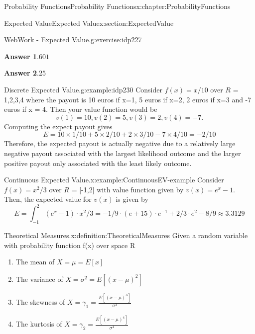 \documentclass[oneside,10pt,]{book}
\newcommand{\blocktitlefont}{\relax}
\numberwithin{equation}{section}
\begin{document}
\begin{chapterptx}{Probability Functions}{}{Probability Functions}{}{}{x:chapter:ProbabilityFunctions}
\begin{sectionptx}{Expected Value}{}{Expected Value}{}{}{x:section:ExpectedValue}
\begin{inlineexercise}{WebWork - Expected Value.}{g:exercise:idp227}
\par\smallskip%
\noindent\textbf{\blocktitlefont Answer 1}.\hypertarget{g:answer:idp228}{}\quad{}\(601\)%
\par\smallskip%
\noindent\textbf{\blocktitlefont Answer 2}.\hypertarget{g:answer:idp229}{}\quad{}\(25\)%
\end{inlineexercise}%
\begin{example}{Discrete Expected Value.}{g:example:idp230}%
Consider \(f(x) = x/10\) over \(R\) = \textbraceleft{}1,2,3,4\textbraceright{} where the payout is 10 euros if x=1, 5 euros if x=2, 2 euros if x=3 and -7 euros if x = 4.  Then your value function would be%
\begin{equation*}
v(1)=10, v(2) = 5, v(3)=2, v(4) = -7.
\end{equation*}
Computing the expect payout gives%
\begin{equation*}
E = 10 \times 1/10 + 5 \times 2/10 + 2 \times 3/10 - 7 \times 4/10 = -2/10
\end{equation*}
Therefore, the expected payout is actually negative due to a relatively large negative payout associated with the largest likelihood outcome and the larger positive payout only associated with the least likely outcome.%
\end{example}
%
\par
\begin{example}{Continuous Expected Value.}{x:example:ContinuousEV-example}%
Consider \(f(x) = x^2/3\) over \(R\) = [-1,2] with value function given by \(v(x) = e^x - 1\). Then, the expected value for \(v(x)\) is given by%
\begin{equation*}
E = \int_{-1}^2 (e^x-1) \cdot x^2/3 = -1/9 \cdot (e + 15) \cdot e^{-1} + 2/3 \cdot e^2 - 8/9 \approx 3.3129
\end{equation*}
%
\end{example}
%
\par
\begin{definition}{Theoretical Measures.}{x:definition:TheoreticalMeasures}%
Given a random variable with probability function f(x) over space R%
\begin{enumerate}
\item\hypertarget{x:li:TheoreticalMean}{}The mean of \(X = \mu = E[x]\)%
\item\hypertarget{x:li:TheoreticalVariance}{}The variance of \(X = \sigma^2 = E[(x-\mu)^2]\)%
\item\hypertarget{x:li:TheoreticalSkewness}{}The skewness of \(X = \gamma_1 = \frac{E[(x-\mu)^3]}{\sigma^3}\)%
\item\hypertarget{x:li:TheoreticalKurtosis}{}The kurtosis of \(X = \gamma_2 = \frac{E[(x-\mu)^4]}{\sigma^4}\)%

\end{enumerate}
\end{definition}
\end{sectionptx}
\end{chapterptx}
\end{document}
